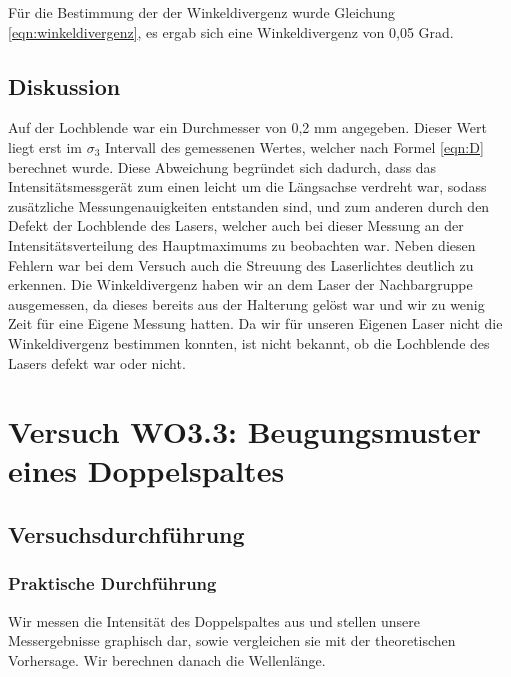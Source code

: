 \documentclass[12pt]{scrartcl}
\begin{document}
Für die  Bestimmung der  der Winkeldivergenz wurde Gleichung \ref{eqn:winkeldivergenz}, es ergab sich eine Winkeldivergenz von 0,05 Grad.

\subsection{Diskussion}
Auf der Lochblende war ein Durchmesser von 0,2 mm angegeben. Dieser Wert liegt erst im $\sigma_3$ Intervall des gemessenen Wertes, welcher nach Formel \ref{eqn:D} berechnet wurde. Diese Abweichung begründet sich dadurch, dass das Intensitätsmessgerät zum einen leicht um die
Längsachse verdreht war, sodass zusätzliche Messungenauigkeiten entstanden sind, und zum anderen durch den Defekt der Lochblende des Lasers, welcher auch bei dieser Messung an der Intensitätsverteilung des Hauptmaximums zu beobachten war. Neben diesen Fehlern war bei dem Versuch auch die Streuung des Laserlichtes deutlich zu erkennen.
Die Winkeldivergenz haben wir an dem Laser der Nachbargruppe ausgemessen, da dieses bereits aus der Halterung gelöst war und wir zu wenig Zeit für eine Eigene Messung hatten. Da wir für unseren Eigenen Laser nicht die Winkeldivergenz bestimmen konnten, ist nicht bekannt, ob die Lochblende des Lasers defekt war oder nicht.

\section{Versuch WO3.3: Beugungsmuster eines Doppelspaltes}
\subsection{Versuchsdurchführung}

\subsubsection{Praktische Durchführung}
Wir messen die Intensität des Doppelspaltes aus und stellen unsere Messergebnisse graphisch dar, sowie vergleichen sie mit der theoretischen Vorhersage. Wir berechnen danach die Wellenlänge.
\end{document}
